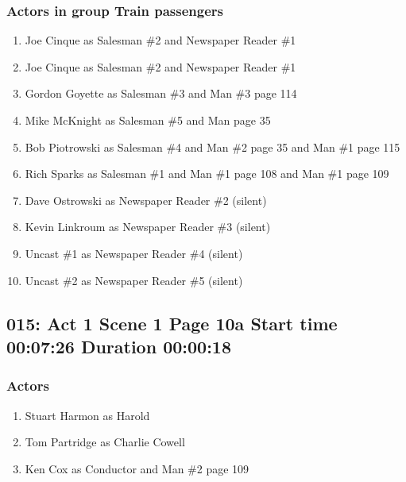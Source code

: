 \subsubsection{Actors in group Train passengers}
\begin{enumerate}
\item Joe Cinque as Salesman \#2 and Newspaper Reader \#1
\item Joe Cinque as Salesman \#2 and Newspaper Reader \#1
\item Gordon Goyette as Salesman \#3 and Man \#3 page 114
\item Mike McKnight as Salesman \#5 and Man page 35
\item Bob Piotrowski as Salesman \#4 and Man \#2 page 35 and Man \#1 page 115
\item Rich Sparks as Salesman \#1 and Man \#1 page 108 and Man \#1 page 109
\item Dave Ostrowski as Newspaper Reader \#2 (silent)
\item Kevin Linkroum as Newspaper Reader \#3 (silent)
\item Uncast \#1 as Newspaper Reader \#4 (silent)
\item Uncast \#2 as Newspaper Reader \#5 (silent)
\end{enumerate}


\subsection{015: Act 1 Scene 1 Page 10a Start time 00:07:26 Duration 00:00:18}

\subsubsection{Actors}
\begin{enumerate}
\item Stuart Harmon as Harold
\item Tom Partridge as Charlie Cowell
\item Ken Cox as Conductor and Man \#2 page 109
\end{enumerate}
